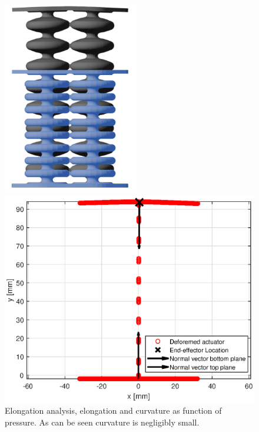 \begin{figure}[H]
    \centering
\begin{minipage}{0.5\textwidth}
        \centering
        \includegraphics[width=0.53\textwidth]{Figures/Chapter3/elongation.png} 
        \caption{Elongation analysis, elongation and curvature as function of pressure. As can be seen curvature is negligibly small. }
        \label{fig3:schematicelong}
    \end{minipage}\hfill
    \begin{minipage}{0.5\textwidth}
        \centering
        \includegraphics[width=\textwidth]{Figures/Chapter3/elongation60good.eps} 

\end{minipage}
\end{figure}
